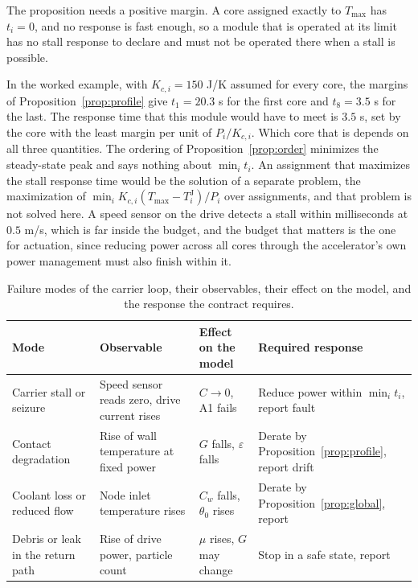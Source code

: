 \documentclass[11pt]{article}
\theoremstyle{definition}
\theoremstyle{plain}
\theoremstyle{remark}
\begin{document}
The proposition needs a positive margin. A core assigned exactly to $T_{\max}$ has $t_i=0$, and no response is fast enough, so a module that is operated at its limit has no stall response to declare and must not be operated there when a stall is possible.

In the worked example, with $K_{c,i}=150$ J/K assumed for every core, the margins of Proposition~\ref{prop:profile} give $t_1=20.3$ s for the first core and $t_8=3.5$ s for the last. The response time that this module would have to meet is $3.5$ s, set by the core with the least margin per unit of $P_i/K_{c,i}$. Which core that is depends on all three quantities. The ordering of Proposition~\ref{prop:order} minimizes the steady-state peak and says nothing about $\min_i t_i$. An assignment that maximizes the stall response time would be the solution of a separate problem, the maximization of $\min_i K_{c,i}(T_{\max}-T^{\mathrm J}_i)/P_i$ over assignments, and that problem is not solved here. A speed sensor on the drive detects a stall within milliseconds at $0.5$ m/s, which is far inside the budget, and the budget that matters is the one for actuation, since reducing power across all cores through the accelerator's own power management must also finish within it.

\begin{table}[t]
\centering
\small
\begin{tabular}{@{}P{2.6cm}P{3.4cm}P{3.4cm}P{3.4cm}@{}}
\toprule
Mode & Observable & Effect on the model & Required response \\
\midrule
Carrier stall or seizure & Speed sensor reads zero, drive current rises & $C\to0$, A1 fails & Reduce power within $\min_i t_i$, report fault \\
Contact degradation & Rise of wall temperature at fixed power & $G$ falls, $\varepsilon$ falls & Derate by Proposition~\ref{prop:profile}, report drift \\
Coolant loss or reduced flow & Node inlet temperature rises & $C_w$ falls, $\theta_0$ rises & Derate by Proposition~\ref{prop:global}, report \\
Debris or leak in the return path & Rise of drive power, particle count & $\mu$ rises, $G$ may change & Stop in a safe state, report \\
\bottomrule
\end{tabular}
\caption{Failure modes of the carrier loop, their observables, their effect on the model, and the response the contract requires.}
\label{tab:modes}
\end{table}
\end{document}
